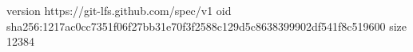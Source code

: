 version https://git-lfs.github.com/spec/v1
oid sha256:1217ac0cc7351f06f27bb31e70f3f2588c129d5c8638399902df541f8c519600
size 12384
